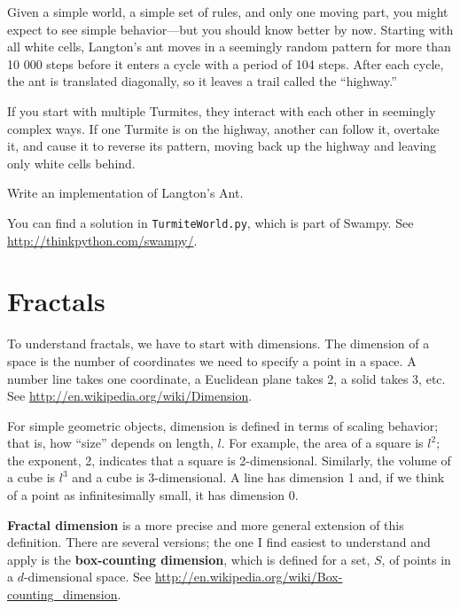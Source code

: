 \documentclass[10pt]{book}
\begin{document}
Given a simple world, a simple set of rules, and only one moving part,
you might expect to see simple behavior---but you should know
better by now.  Starting with all white cells, Langton's ant
moves in a seemingly random pattern for more than 10 000 steps
before it enters a cycle with a period of 104 steps.  After
each cycle, the ant is translated diagonally, so it leaves
a trail called the ``highway.''

If you start with multiple Turmites, they interact with each
other in seemingly complex ways.  If one Turmite is on the
highway, another can follow it, overtake it, and cause it to
reverse its pattern, moving back up the highway and leaving
only white cells behind.

\begin{exercise}

Write an implementation of Langton's Ant.

You can find a solution in {\tt TurmiteWorld.py}, which is
part of Swampy.  See \url{http://thinkpython.com/swampy/}.

\end{exercise}




\chapter{Fractals}
\label{fractals}

To understand fractals, we have to start with dimensions.  The
dimension of a space is the number of coordinates we need to specify a
point in a space.  A number line takes one coordinate, a Euclidean
plane takes 2, a solid takes 3, etc.  See
\url{http://en.wikipedia.org/wiki/Dimension}.

For simple geometric objects, dimension is defined in terms of scaling
behavior; that is, how ``size'' depends on length, $l$.  For example,
the area of a square is $l^2$; the exponent, 2, indicates that a
square is 2-dimensional.  Similarly, the volume of a cube is $l^3$ and
a cube is 3-dimensional.  A line has dimension 1 and, if we think of a
point as infinitesimally small, it has dimension 0.

{\bf Fractal dimension} is a more precise and more general extension
of this definition.  There are several versions; the one I find
easiest to understand and apply is the {\bf box-counting dimension},
which is defined for a set, $S$, of points in a $d$-dimensional
space.  See \url{http://en.wikipedia.org/wiki/Box-counting_dimension}.
\end{document}
